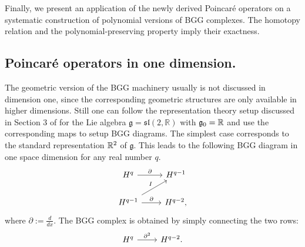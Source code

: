 \documentclass[11pt]{amsart}
\newcommand{\0}{\mathaccent23}
\begin{document}
 Finally, we present an application of the newly derived Poincar\'e operators on a systematic construction of polynomial versions of BGG complexes. The homotopy relation and the polynomial-preserving property imply their exactness.

 

\subsection{Poincar\'e operators in one dimension.} The geometric version of the BGG machinery usually is not discussed in dimension one, since the corresponding geometric structures are only available in higher dimensions. Still one can follow the representation theory setup discussed in Section 3 of \cite{vcap2022bgg} for the Lie algebra $\mathfrak g=\mathfrak{sl}(2,\mathbb R)$ with $\mathfrak g_0=\Bbb R$ and use the corresponding maps to setup BGG diagrams. The simplest case corresponds to the standard representation $\Bbb R^2$ of $\mathfrak g$. This leads to the following BGG diagram in one space dimension for any real number $q$.
\begin{equation} \label{diagram-1D}
\begin{tikzcd}
 H^{q} \arrow{r}{\partial} &H^{q-1} \\
 H^{q-1}\arrow{r}{\partial} \arrow[ur, "I"]&H^{q-2},
 \end{tikzcd}
\end{equation}
where $\partial:=\frac{d}{dx}$.
The BGG complex is obtained by simply connecting the two rows:
\begin{equation}\label{BGG-1D}
\begin{tikzcd}
H^{q}\arrow{r}{\partial^{2}}& H^{q-2}.
\end{tikzcd}
\end{equation}
\end{document}
